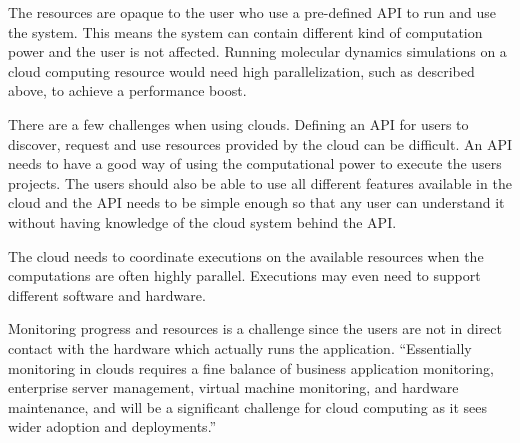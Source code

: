 The resources are opaque to the user who use a pre-defined API to run
and use the system. This means the system can contain different kind
of computation power and the user is not affected. Running molecular
dynamics simulations on a cloud computing resource would need high
parallelization, such as described above, to achieve a performance
boost.



There are a few challenges when using clouds. Defining an API for
users to discover, request and use resources provided by the cloud can
be difficult. An API needs to have a good way of using the
computational power to execute the users projects. The users should
also be able to use all different features available in the cloud and
the API needs to be simple enough so that any user can understand it
without having knowledge of the cloud system behind the API.

The cloud needs to coordinate executions on the available resources
when the computations are often highly parallel. Executions may even
need to support different software and hardware.



Monitoring progress and resources is a challenge since the users are
not in direct contact with the hardware which actually runs the
application. ``Essentially monitoring in clouds requires a fine
balance of business application monitoring, enterprise server
management, virtual machine monitoring, and hardware maintenance, and
will be a significant challenge for cloud computing as it sees wider
adoption and deployments.''\citep{foster:2008}


